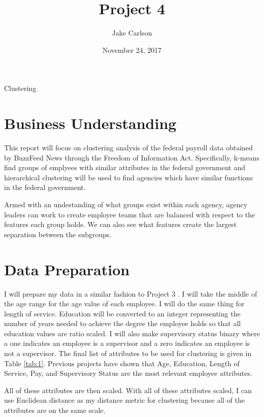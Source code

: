 \documentclass{article}
\begin{document}
\title{Project 4}
\author{Jake Carlson}
\date{November 24, 2017}
\maketitle

\abstract
Clustering

\newpage

\tableofcontents
\newpage

\section{Business Understanding}
This report will focus on clustering analysis of the federal payroll data obtained by BuzzFeed News through the Freedom of Information Act. Specifically, k-means find groups of emplyees with similar attributes in the federal government and hierarchical clustering will be used to find agencies which have similar functions in the federal government.
\par
Armed with an undestanding of what groups exist within each agency, agency leaders can work to create employee teams that are balanced with respect to the features each group holds. We can also see what features create the largest separation between the subgroups.

\section{Data Preparation}
I will prepare my data in a similar fashion to Project 3 \cite{proj3}. I will take the middle of the age range for the age value of each employee. I will do the same thing for length of service. Education will be converted to an integer representing the number of years needed to achieve the degree the employee holds so that all education values are ratio scaled. I will also make supervisory status binary where a one indicates an employee is a supervisor and a zero indicates an employee is not a supervisor. The final list of attributes to be used for clustering is given in Table \ref{tab:1}. Previous projects have shown that Age, Education, Length of Service, Pay, and Supervisory Status are the most relevant employee attributes.
\par
All of these attributes are then scaled. With all of these attributes scaled, I can use Euclidean distance as my distance metric for clustering because all of the attributes are on the same scale.
\end{document}
